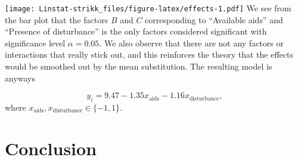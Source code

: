 \documentclass[]{article}
\newenvironment{Shaded}{\begin{snugshade}}{\end{snugshade}}
\newcommand{\KeywordTok}[1]{\textcolor[rgb]{0.13,0.29,0.53}{\textbf{#1}}}
\newcommand{\DataTypeTok}[1]{\textcolor[rgb]{0.13,0.29,0.53}{#1}}
\newcommand{\DecValTok}[1]{\textcolor[rgb]{0.00,0.00,0.81}{#1}}
\newcommand{\FloatTok}[1]{\textcolor[rgb]{0.00,0.00,0.81}{#1}}
\newcommand{\StringTok}[1]{\textcolor[rgb]{0.31,0.60,0.02}{#1}}
\newcommand{\CommentTok}[1]{\textcolor[rgb]{0.56,0.35,0.01}{\textit{#1}}}
\newcommand{\OtherTok}[1]{\textcolor[rgb]{0.56,0.35,0.01}{#1}}
\newcommand{\OperatorTok}[1]{\textcolor[rgb]{0.81,0.36,0.00}{\textbf{#1}}}
\newcommand{\NormalTok}[1]{#1}
\begin{document}
\begin{Shaded}
\end{Shaded}

\texttt{[image: Linstat-strikk\_files/figure-latex/effects-1.pdf]} We see
from the bar plot that the factors \(B\) and \(C\) corresponding to
``Available aids'' and ``Presence of disturbance'' is the only factors
considered significant with significance level \(\alpha = 0.05\). We
also observe that there are not any factors or interactions that really
stick out, and this reinforces the theory that the effects would be
smoothed out by the mean substitution. The resulting model is anyways

\[y_i = 9.47 - 1.35 x_\text{aids} - 1.16 x_\text{disturbance},\] where
\(x_\text{aids}, x_\text{disturbance} \in \{-1, 1\}\).

\section{Conclusion}\label{conclusion}
\end{document}
